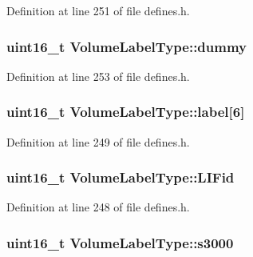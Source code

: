 Definition at line 251 of file defines.\+h.

\subsubsection[{\texorpdfstring{dummy}{dummy}}]{\setlength{\rightskip}{0pt plus 5cm}uint16\+\_\+t Volume\+Label\+Type\+::dummy}\hypertarget{structVolumeLabelType_affbd520c08374524f13708acc05f3f4e}{}\label{structVolumeLabelType_affbd520c08374524f13708acc05f3f4e}


Definition at line 253 of file defines.\+h.

\subsubsection[{\texorpdfstring{label}{label}}]{\setlength{\rightskip}{0pt plus 5cm}uint16\+\_\+t Volume\+Label\+Type\+::label\mbox{[}6\mbox{]}}\hypertarget{structVolumeLabelType_a265fc834b203868cc48482a8be64f60c}{}\label{structVolumeLabelType_a265fc834b203868cc48482a8be64f60c}


Definition at line 249 of file defines.\+h.

\subsubsection[{\texorpdfstring{L\+I\+Fid}{LIFid}}]{\setlength{\rightskip}{0pt plus 5cm}uint16\+\_\+t Volume\+Label\+Type\+::\+L\+I\+Fid}\hypertarget{structVolumeLabelType_a16bdde2d19114ac3238477c29fe75b4a}{}\label{structVolumeLabelType_a16bdde2d19114ac3238477c29fe75b4a}


Definition at line 248 of file defines.\+h.

\subsubsection[{\texorpdfstring{s3000}{s3000}}]{\setlength{\rightskip}{0pt plus 5cm}uint16\+\_\+t Volume\+Label\+Type\+::s3000}\hypertarget{structVolumeLabelType_ac7659e37fbb2bcb0b66c0a0172f9b16c}{}\label{structVolumeLabelType_ac7659e37fbb2bcb0b66c0a0172f9b16c}


